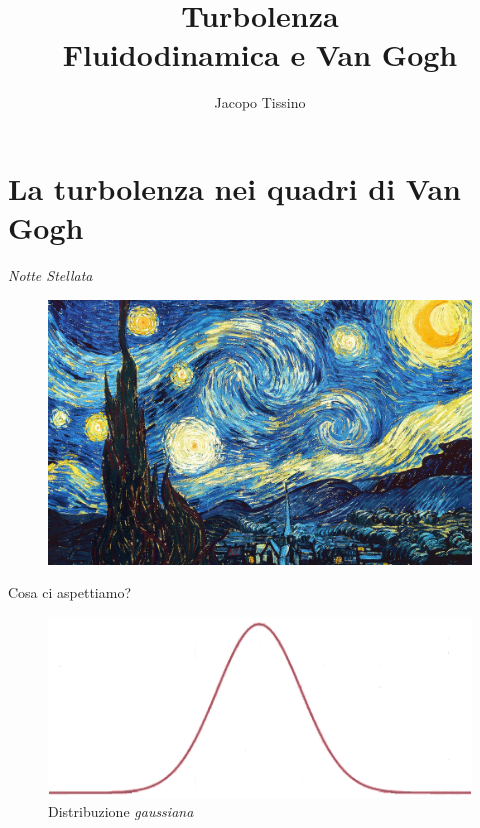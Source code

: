 \documentclass[11pt]{beamer}
\author{Jacopo Tissino}
\title{Turbolenza\\
Fluidodinamica e Van Gogh}
\institute{Liceo Scientifico ``M. Grigoletti''}
\begin{document}
\begin{frame}
\titlepage
\end{frame}

\begin{frame}
\tableofcontents
\end{frame}

\section{La turbolenza nei quadri di Van Gogh}

\begin{frame}{\emph{Notte Stellata}}
\begin{figure}
\centering
\includegraphics[scale=0.11]{the-starry-night-1889.jpg}
\end{figure}
\end{frame}

\begin{frame}{Cosa ci aspettiamo?}
\begin{figure}
\centering
\includegraphics[scale=0.6]{gauss1.png}
\caption{Distribuzione \emph{gaussiana} }
\end{figure}
\end{frame}
\end{document}
